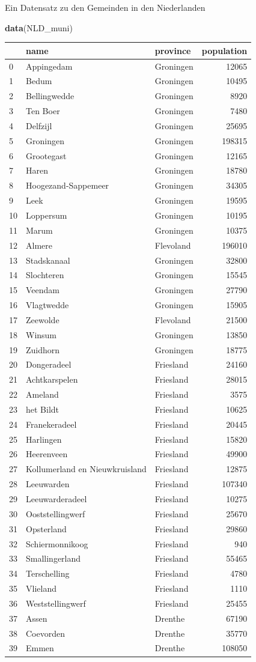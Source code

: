 \documentclass[ignorenonframetext,]{beamer}
\newenvironment{Shaded}{\begin{snugshade}}{\end{snugshade}}
\newcommand{\KeywordTok}[1]{\textcolor[rgb]{0.13,0.29,0.53}{\textbf{#1}}}
\newcommand{\NormalTok}[1]{#1}
\begin{document}
\begin{frame}[fragile]{Ein Datensatz zu den Gemeinden in den
Niederlanden}

\begin{Shaded}
\begin{Highlighting}[]
\KeywordTok{data}\NormalTok{(NLD_muni)}
\end{Highlighting}
\end{Shaded}

\begin{longtable}[]{@{}lllr@{}}
\toprule
& name & province & population\tabularnewline
\midrule
\endhead
0 & Appingedam & Groningen & 12065\tabularnewline
1 & Bedum & Groningen & 10495\tabularnewline
2 & Bellingwedde & Groningen & 8920\tabularnewline
3 & Ten Boer & Groningen & 7480\tabularnewline
4 & Delfzijl & Groningen & 25695\tabularnewline
5 & Groningen & Groningen & 198315\tabularnewline
6 & Grootegast & Groningen & 12165\tabularnewline
7 & Haren & Groningen & 18780\tabularnewline
8 & Hoogezand-Sappemeer & Groningen & 34305\tabularnewline
9 & Leek & Groningen & 19595\tabularnewline
10 & Loppersum & Groningen & 10195\tabularnewline
11 & Marum & Groningen & 10375\tabularnewline
12 & Almere & Flevoland & 196010\tabularnewline
13 & Stadskanaal & Groningen & 32800\tabularnewline
14 & Slochteren & Groningen & 15545\tabularnewline
15 & Veendam & Groningen & 27790\tabularnewline
16 & Vlagtwedde & Groningen & 15905\tabularnewline
17 & Zeewolde & Flevoland & 21500\tabularnewline
18 & Winsum & Groningen & 13850\tabularnewline
19 & Zuidhorn & Groningen & 18775\tabularnewline
20 & Dongeradeel & Friesland & 24160\tabularnewline
21 & Achtkarspelen & Friesland & 28015\tabularnewline
22 & Ameland & Friesland & 3575\tabularnewline
23 & het Bildt & Friesland & 10625\tabularnewline
24 & Franekeradeel & Friesland & 20445\tabularnewline
25 & Harlingen & Friesland & 15820\tabularnewline
26 & Heerenveen & Friesland & 49900\tabularnewline
27 & Kollumerland en Nieuwkruisland & Friesland & 12875\tabularnewline
28 & Leeuwarden & Friesland & 107340\tabularnewline
29 & Leeuwarderadeel & Friesland & 10275\tabularnewline
30 & Ooststellingwerf & Friesland & 25670\tabularnewline
31 & Opsterland & Friesland & 29860\tabularnewline
32 & Schiermonnikoog & Friesland & 940\tabularnewline
33 & Smallingerland & Friesland & 55465\tabularnewline
34 & Terschelling & Friesland & 4780\tabularnewline
35 & Vlieland & Friesland & 1110\tabularnewline
36 & Weststellingwerf & Friesland & 25455\tabularnewline
37 & Assen & Drenthe & 67190\tabularnewline
38 & Coevorden & Drenthe & 35770\tabularnewline
39 & Emmen & Drenthe & 108050\tabularnewline

\end{longtable}
\end{frame}
\end{document}
